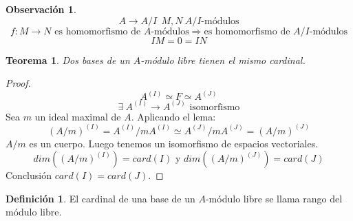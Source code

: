 \documentclass{article}
\theoremstyle{theorem-style}  %
\newtheorem{theorem}{Teorema}[section]  %
\theoremstyle{definition}
\newtheorem{definition}{Definición}[section]
\newtheorem*{observation}{Observación} %
\theoremstyle{example-style}
\begin{document}
	\begin{observation}
		\[A\rightarrow A/I \ \  M,N \  A/I\text{-módulos}\]
		\[f:M\rightarrow N \text{ es homomorfismo de $A$-módulos} \Rightarrow \text{es homomorfismo de $A/I$-módulos}\]
		\[IM=0=IN\]
	\end{observation}

	\begin{theorem}
		Dos bases de un $A$-módulo libre tienen el mismo cardinal.
	\end{theorem}

	\begin{proof}
		\[A^{(I)} \simeq F \simeq A^{(J)}\]
		\[\exists \  A^{(I)} \rightarrow A^{(J)} \text{ isomorfismo}\]
		Sea $m$ un ideal maximal de $A$. Aplicando el lema:
		\[ (A/m)^{(I)} = A^{(I)}/mA^{(I)} \simeq A^{(J)}/mA^{(J)} = (A/m)^{(J)} \]
		$A/m$ es un cuerpo. Luego tenemos un isomorfismo de espacios vectoriales.
		\[dim((A/m)^{(I)})=card(I) \text{ y } dim((A/m)^{(J)})=card(J)\]
		Conclusión $card(I)=card(J)$.
	\end{proof}

	\begin{definition}
		El cardinal de una base de un $A$-módulo libre se llama rango del módulo libre.
	\end{definition}
\end{document}
